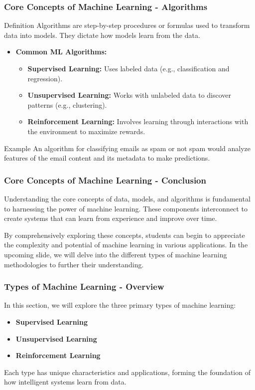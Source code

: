 \documentclass[aspectratio=169]{beamer}
\begin{document}
\begin{frame}[fragile]
    \frametitle{Core Concepts of Machine Learning - Algorithms}
    \begin{block}{Definition}
        Algorithms are step-by-step procedures or formulas used to transform data into models. They dictate how models learn from the data.
    \end{block}

    \begin{itemize}
        \item \textbf{Common ML Algorithms:}
        \begin{itemize}
            \item \textbf{Supervised Learning:} Uses labeled data (e.g., classification and regression).
            \item \textbf{Unsupervised Learning:} Works with unlabeled data to discover patterns (e.g., clustering).
            \item \textbf{Reinforcement Learning:} Involves learning through interactions with the environment to maximize rewards.
        \end{itemize}
    \end{itemize}

    \begin{block}{Example}
        An algorithm for classifying emails as spam or not spam would analyze features of the email content and its metadata to make predictions.
    \end{block}
\end{frame}

\begin{frame}[fragile]
    \frametitle{Core Concepts of Machine Learning - Conclusion}
    Understanding the core concepts of data, models, and algorithms is fundamental to harnessing the power of machine learning. These components interconnect to create systems that can learn from experience and improve over time.

    By comprehensively exploring these concepts, students can begin to appreciate the complexity and potential of machine learning in various applications. In the upcoming slide, we will delve into the different types of machine learning methodologies to further their understanding.
\end{frame}

\begin{frame}[fragile]
    \frametitle{Types of Machine Learning - Overview}
    In this section, we will explore the three primary types of machine learning: 
    \begin{itemize}
        \item \textbf{Supervised Learning}
        \item \textbf{Unsupervised Learning}
        \item \textbf{Reinforcement Learning}
    \end{itemize}
    Each type has unique characteristics and applications, forming the foundation of how intelligent systems learn from data.
\end{frame}
\end{document}
